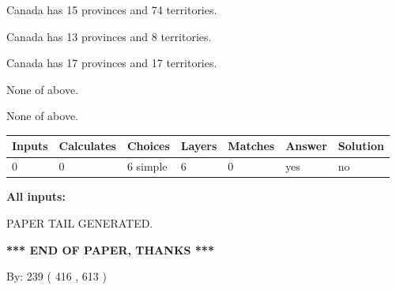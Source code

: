 \documentclass[12pt]{article}
\begin{document}
 
Canada has  15 provinces and  74 territories.
 
 
Canada has  13 provinces and  8 territories.
 
 
Canada has  17 provinces and  17 territories.
 
 
 None of above.
 
 
\noindent{}
 
 
 None of above.
 
 
\noindent{}
 
 
   
   
   
   
\noindent\begin{tabular}{|l|l|l|l|l|l|l|}
 \hline
Inputs & Calculates & Choices & Layers & Matches & Answer & Solution \\ \hline
 0  & 
 0  & 
 6
  simple  
  & 
 6  & 
 0  & 
  yes & 
  no 
  \\ \hline
 \end{tabular}
   
   
   
   
\noindent{}
   
   
   
   
\noindent\vspace{0.1in}\hspace{-0.08in} {\textbf{\Large{All inputs: }}}
   
   
   
   
   
   
 \vspace{0.2in}
 
   
   
\vspace{2.0in} PAPER TAIL GENERATED.
   
   
   
   
\vspace{1.0in} 
{\textbf{\large{ *** END OF PAPER, THANKS *** }}} 
   
   
\hspace{1.0in} By: 
 239 ( 416 ,  613 )
   
   
   
   
\newpage 
\setcounter{page}{ 
   417001 } 
   
\end{document}
